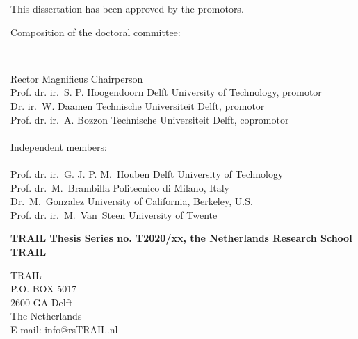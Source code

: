 \begin{small}

\noindent This dissertation has been approved by the promotors.\\
\bigskip{}

\noindent Composition of the doctoral committee:
\smallskip{}

\noindent \begin{flushleft}\begin{tabbing}
\hspace*{70mm}\=\kill

Rector Magnificus \> Chairperson\\
Prof. dr. ir.\ S. P. Hoogendoorn \> Delft University of Technology, promotor\\
Dr. ir.\ W. Daamen \> Technische Universiteit Delft, promotor\\
Prof. dr. ir.\ A. Bozzon \> Technische Universiteit Delft, copromotor\\
\bigskip{}\\

\noindent Independent members:\\
\\

Prof. dr. ir.\ G. J. P. M.\ Houben \> Delft University of Technology\\
Prof. dr.\ M.\ Brambilla \> Politecnico di Milano, Italy\\
Dr.\ M.\ Gonzalez \> University of California, Berkeley, U.S.\\
Prof. dr. ir.\ M.\ Van\ Steen \> University of Twente\\
\end{tabbing}\end{flushleft}

\vspace*{\fill}


\bigskip{}
\noindent\textbf{TRAIL Thesis Series no. T2020/xx, the Netherlands Research School TRAIL}\\
\smallskip{}

\noindent TRAIL\\
P.O. BOX 5017\\
2600 GA Delft\\
The Netherlands\\
E-mail: info@rsTRAIL.nl\\
\bigskip{}


\end{small}
